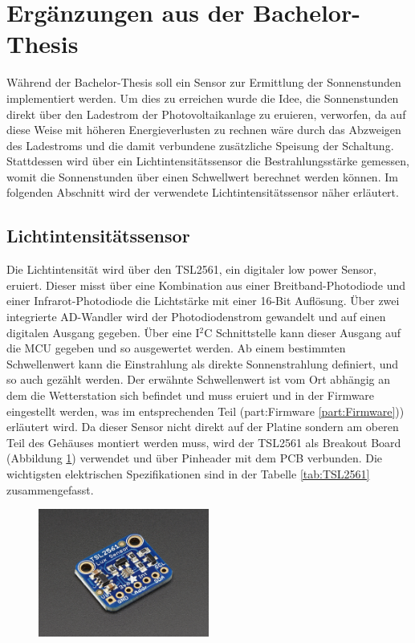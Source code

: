 \section{Ergänzungen aus der Bachelor-Thesis}
Während der Bachelor-Thesis soll ein Sensor zur Ermittlung der Sonnenstunden implementiert werden. Um dies zu erreichen wurde die Idee, die Sonnenstunden direkt über den Ladestrom der Photovoltaikanlage zu eruieren, verworfen, da auf diese Weise mit höheren Energieverlusten zu rechnen wäre durch das Abzweigen des Ladestroms und die damit verbundene zusätzliche Speisung der Schaltung. Stattdessen wird über ein Lichtintensitätssensor die Bestrahlungsstärke gemessen, womit die Sonnenstunden über einen Schwellwert berechnet werden können. Im folgenden Abschnitt wird der verwendete Lichtintensitätssensor näher erläutert.

\subsection{Lichtintensitätssensor}
Die Lichtintensität wird über den TSL2561, ein digitaler low power Sensor, eruiert. Dieser misst über eine Kombination aus einer Breitband-Photodiode und einer Infrarot-Photodiode die Lichtstärke mit einer 16-Bit Auflösung. Über zwei integrierte AD-Wandler wird der Photodiodenstrom gewandelt und auf einen digitalen Ausgang gegeben. Über eine I$^{2}$C Schnittstelle kann dieser Ausgang auf die MCU gegeben und so ausgewertet werden. Ab einem bestimmten Schwellenwert kann die Einstrahlung als direkte Sonnenstrahlung definiert, und so auch gezählt werden. Der erwähnte Schwellenwert ist vom Ort abhängig an dem die Wetterstation sich befindet und muss eruiert und in der Firmware eingestellt werden, was im entsprechenden Teil (\refname{part:Firmware} \ref{part:Firmware})) erläutert wird. Da dieser Sensor nicht direkt auf der Platine sondern am oberen Teil des Gehäuses montiert werden muss, wird der TSL2561 als Breakout Board (Abbildung \ref{fig:TSL}) verwendet und über Pinheader mit dem PCB verbunden. Die wichtigsten elektrischen Spezifikationen sind in der Tabelle \ref{tab:TSL2561} zusammengefasst. \cite{TSL2561}\\

\begin{figure}[hbtp]
\centering
\includegraphics[width=0.5\textwidth]{graphics/TSL2561/TSL2561_Breakout.JPG}
\label{fig:TSL}
\end{figure}

